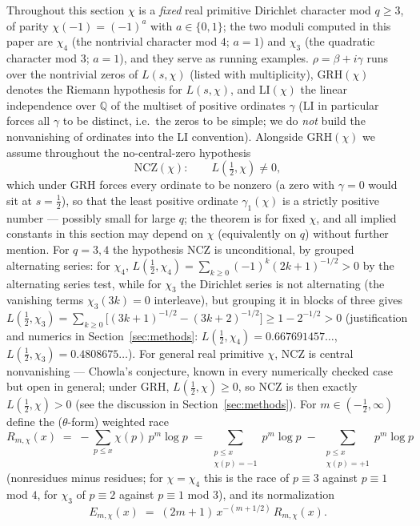 \documentclass[11pt]{article}
\begin{document}
Throughout this section $\chi$ is a \emph{fixed} real primitive
Dirichlet character mod $q\ge3$, of parity $\chi(-1)=(-1)^a$ with
$a\in\{0,1\}$; the two moduli computed in this paper are $\chi_4$ (the
nontrivial character mod $4$; $a=1$) and $\chi_3$ (the quadratic
character mod $3$; $a=1$), and they serve as running examples.
$\rho=\beta+i\gamma$ runs over the nontrivial zeros of
$L(s,\chi)$ (listed with multiplicity), GRH$(\chi)$ denotes the Riemann
hypothesis for $L(s,\chi)$, and LI$(\chi)$ the linear independence over
$\mathbb Q$ of the multiset of positive ordinates $\gamma$ (LI in
particular forces all $\gamma$ to be distinct, i.e.\ the zeros to be
simple; we do \emph{not} build the nonvanishing of ordinates into the
LI convention). Alongside GRH$(\chi)$ we assume throughout the
no-central-zero hypothesis
\[
\mathrm{NCZ}(\chi):\qquad L(\tfrac12,\chi)\neq0 ,
\]
which under GRH forces every ordinate to be nonzero (a zero with
$\gamma=0$ would sit at $s=\tfrac12$), so that the least positive
ordinate $\gamma_1(\chi)$ is a strictly positive number --- possibly
small for large $q$; the theorem is for fixed $\chi$, and all implied
constants in this section may depend on $\chi$ (equivalently on $q$)
without further mention. For $q=3,4$ the hypothesis NCZ is
unconditional, by grouped alternating series: for $\chi_4$,
$L(\tfrac12,\chi_4)=\sum_{k\ge0}(-1)^k(2k+1)^{-1/2}>0$ by the
alternating series test, while for $\chi_3$ the Dirichlet series is
not alternating (the vanishing terms $\chi_3(3k)=0$ interleave), but
grouping it in blocks of three gives
$L(\tfrac12,\chi_3)=\sum_{k\ge0}\bigl[(3k+1)^{-1/2}-(3k+2)^{-1/2}\bigr]
\ge1-2^{-1/2}>0$ (justification and numerics in
Section~\ref{sec:methods}: $L(\tfrac12,\chi_4)=0.667691457\ldots$,
$L(\tfrac12,\chi_3)=0.4808675\ldots$). For general real primitive
$\chi$, NCZ is central nonvanishing --- Chowla's conjecture, known in
every numerically checked case but open in general; under GRH,
$L(\tfrac12,\chi)\ge0$, so NCZ is then exactly $L(\tfrac12,\chi)>0$
(see the discussion in Section~\ref{sec:methods}). For
$m\in(-\tfrac12,\infty)$ define the ($\theta$-form) weighted race
\[
R_{m,\chi}(x)\;=\;-\sum_{p\le x}\chi(p)\,p^m\log p
\;=\;\sum_{\substack{p\le x\\ \chi(p)=-1}}p^m\log p
\;-\;\sum_{\substack{p\le x\\ \chi(p)=+1}}p^m\log p
\]
(nonresidues minus residues; for $\chi=\chi_4$ this is the race of
$p\equiv3$ against $p\equiv1$ mod $4$, for $\chi_3$ of $p\equiv2$
against $p\equiv1$ mod $3$), and its normalization
\[
E_{m,\chi}(x)\;=\;(2m+1)\,x^{-(m+1/2)}\,R_{m,\chi}(x).
\]
\end{document}
